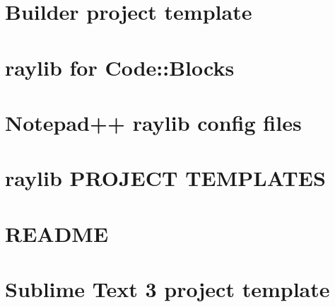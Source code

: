 \let\mypdfximage\pdfximage\def\pdfximage{\immediate\mypdfximage}\documentclass[twoside]{book}
\newcommand{\+}{\discretionary{\mbox{\scriptsize$\hookleftarrow$}}{}{}}
\begin{document}
\chapter{Builder project template}
\label{md_cmake-build-debug__deps_raylib-src_projects__builder__r_e_a_d_m_e}

\chapter{raylib for Code\+::Blocks}
\label{md_cmake-build-debug__deps_raylib-src_projects__code_blocks__r_e_a_d_m_e}

\chapter{Notepad++ raylib config files}
\label{md_cmake-build-debug__deps_raylib-src_projects__notepad_09_09__r_e_a_d_m_e}

\chapter{raylib P\+R\+O\+J\+E\+CT T\+E\+M\+P\+L\+A\+T\+ES}
\label{md_cmake-build-debug__deps_raylib-src_projects__r_e_a_d_m_e}

\chapter{R\+E\+A\+D\+ME}
\label{md_cmake-build-debug__deps_raylib-src_projects_scripts__r_e_a_d_m_e}

\chapter{Sublime Text 3 project template}
\label{md_cmake-build-debug__deps_raylib-src_projects__sublime_text__r_e_a_d_m_e}

\end{document}
